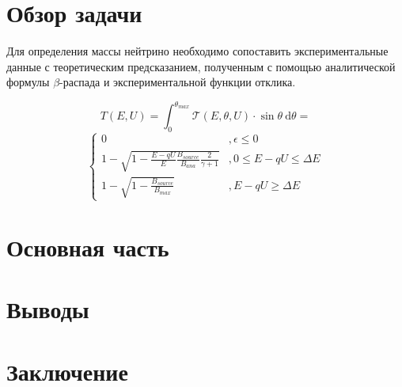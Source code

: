 \documentclass[a4paper,14pt]{extarticle}
\begin{document}


    \newpage
    \section{Обзор задачи}
    
    Для определения массы нейтрино необходимо сопоставить экспериментальные данные
    с теоретическим предсказанием, полученным с помощью аналитической формулы $\beta$-распада
    и экспериментальной функции отклика.
    
    \begin{equation}
      T(E,U) = \int_0^{\theta_{max}} \mathcal T(E, \theta, U) \cdot \sin \theta \: \mathrm d \theta =
    \end{equation}
    \begin{equation}
      \begin{cases} 
        0 & , \epsilon \leq 0 \\
        1 - \sqrt{1-\frac{E-qU}{E} \frac{B_{source}}{B_{ana}} \frac{2}{\gamma + 1}} & , 0 \leq E-qU \leq \Delta E \\
        1 - \sqrt{1-\frac{B_{source}}{B_{max}}} & , E - qU \geq \Delta E
      \end{cases}
    \end{equation}
    
    
    

    
    \newpage
    \section{Основная часть}
    


    \section{Выводы}
    
    \section{Заключение}
    
    \newpage
    \newrefcontext[sorting=none]
    \printbibliography[heading=bibnumbered]
\end{document}
